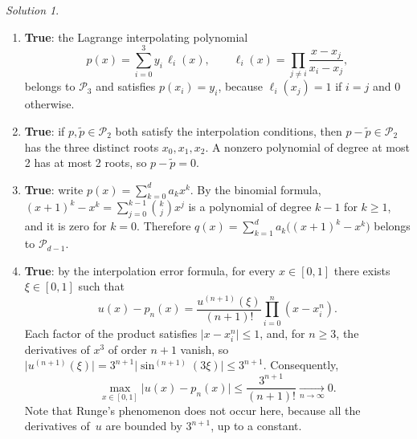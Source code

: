 \documentclass[10pt]{article}
\theoremstyle{definition}
\theoremstyle{remark}
\newtheorem*{protosolution}{Solution}
\newenvironment{solutionframe}
{%
    \begin{mdframed}[
        leftmargin=1cm,
        skipabove=.3cm,
        linecolor=blue,
        backgroundcolor=lightgreen,
        linewidth=0pt,
        innerleftmargin=.5em,
        innerrightmargin=.5em,
        innertopmargin=.3em,
        innerbottommargin=.6em,
    ]
}
{
    \end{mdframed}
}
\newenvironment{solution}
{\pushQED{\qed}\renewcommand{\qedsymbol}{$\triangle$}
\begin{solutionframe}\small \begin{protosolution}}
{\popQED\end{protosolution}\end{solutionframe}}
\begin{document}
\begin{solution}
    \begin{enumerate}
        \item \textbf{True}:
            the Lagrange interpolating polynomial
            \[
                p(x) = \sum_{i=0}^{3} y_i \, \ell_i(x),
                \qquad
                \ell_i(x) = \prod_{j \neq i} \frac{x - x_j}{x_i - x_j},
            \]
            belongs to $\mathcal P_3$ and satisfies $p(x_i) = y_i$,
            because $\ell_i(x_j) = 1$ if $i = j$ and 0 otherwise.

        \item \textbf{True}:
            if $p, \widetilde p \in \mathcal P_2$ both satisfy the interpolation conditions,
            then $p - \widetilde p \in \mathcal P_2$ has the three distinct roots $x_0, x_1, x_2$.
            A nonzero polynomial of degree at most 2 has at most 2 roots,
            so $p - \widetilde p = 0$.

        \item \textbf{True}:
            write $p(x) = \sum_{k=0}^{d} a_k x^k$.
            By the binomial formula,
            $(x+1)^k - x^k = \sum_{j=0}^{k-1} \binom{k}{j} x^j$ is a polynomial of degree $k - 1$ for $k \geq 1$,
            and it is zero for $k = 0$.
            Therefore $q(x) = \sum_{k=1}^{d} a_k \bigl((x+1)^k - x^k\bigr)$ belongs to $\mathcal P_{d-1}$.

        \item \textbf{True}:
            by the interpolation error formula,
            for every $x \in [0, 1]$ there exists $\xi \in [0, 1]$ such that
            \[
                u(x) - p_n(x) = \frac{u^{(n+1)}(\xi)}{(n+1)!} \prod_{i=0}^{n} (x - x^n_i).
            \]
            Each factor of the product satisfies $\lvert x - x^n_i \rvert \leq 1$,
            and, for $n \geq 3$, the derivatives of $x^3$ of order $n+1$ vanish,
            so $\lvert u^{(n+1)}(\xi) \rvert = 3^{n+1} \lvert \sin^{(n+1)}(3 \xi) \rvert \leq 3^{n+1}$.
            Consequently,
            \[
                \max_{x \in [0, 1]} \bigl\lvert u(x) - p_n(x) \bigr\rvert
                \leq \frac{3^{n+1}}{(n+1)!}
                \xrightarrow[n \to \infty]{} 0.
            \]
            Note that Runge's phenomenon does not occur here,
            because all the derivatives of~$u$ are bounded by $3^{n+1}$, up to a constant.
    \end{enumerate}
\end{solution}
\end{document}
